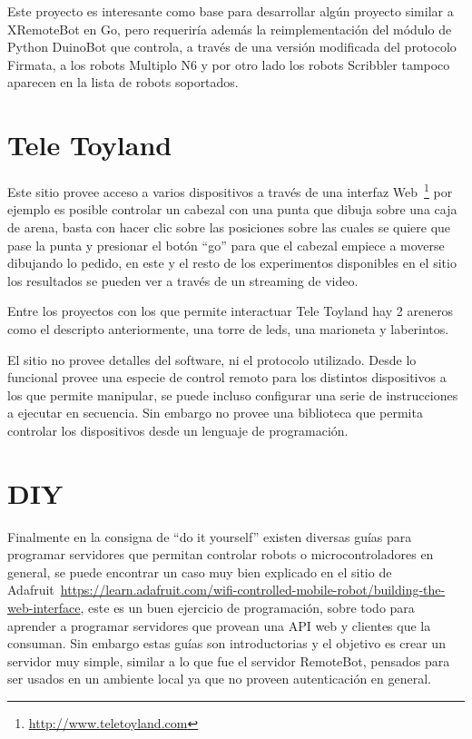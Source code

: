 Este proyecto es interesante como base para desarrollar algún proyecto
similar a XRemoteBot en Go, pero requeriría además la reimplementación
del módulo de Python DuinoBot que controla, a través de una versión
modificada del protocolo Firmata, a los robots Multiplo N6 y por otro
lado los robots Scribbler tampoco aparecen en la lista de robots soportados.

\section{Tele Toyland}

Este sitio provee acceso a varios dispositivos a través de una interfaz
Web~\footnote{\url{http://www.teletoyland.com}}
por ejemplo es posible controlar un cabezal con una punta que dibuja sobre
una caja de arena, basta con hacer clic sobre las posiciones sobre las cuales
se quiere que pase la punta y presionar el botón ``go'' para que el cabezal
empiece a moverse dibujando lo pedido, en este y el resto de los experimentos
disponibles en el sitio los resultados se pueden ver a través de un streaming
de video.

Entre los proyectos con los que permite interactuar Tele Toyland
hay 2 areneros como el descripto
anteriormente, una torre de leds, una marioneta y laberintos.

El sitio no provee detalles del software, ni el protocolo utilizado. Desde
lo funcional
provee una especie de control remoto para los distintos dispositivos a los
que permite
manipular, se puede incluso configurar una serie de instrucciones a ejecutar
en secuencia. Sin embargo no provee una biblioteca que permita controlar
los dispositivos desde un lenguaje de programación.


\section{DIY}
Finalmente en la consigna de ``do it yourself'' existen diversas guías para
programar servidores que permitan controlar robots o microcontroladores
en general, se puede encontrar un caso muy bien explicado en el sitio
de Adafruit~\url{https://learn.adafruit.com/wifi-controlled-mobile-robot/building-the-web-interface},
este es un buen ejercicio de programación, sobre todo para aprender a
programar servidores que provean una API web y clientes que la consuman. Sin
embargo estas guías son introductorias y el objetivo es crear un servidor
muy simple, similar a lo que fue el servidor RemoteBot, pensados para ser
usados en un ambiente local ya que no proveen autenticación en general.

